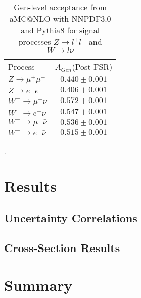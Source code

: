 \documentclass[aps,prd,final,twocolumn,letterpaper]{revtex4}
\begin{document}
			\begin{table}
				\centering
				\begin{tabular}{l  c}
					Process & $A_{Gen}$(Post-FSR) \\
					$Z\rightarrow \mu^{+}\mu^{-}$ & $0.440\pm 0.001$ \\
					$Z\rightarrow e^{+}e^{-}$ & $0.406\pm 0.001$ \\
					$W^{+}\rightarrow \mu^{+}\nu$ & $0.572\pm 0.001$ \\
					$W^{+}\rightarrow e^{+}\nu$ & $0.547\pm 0.001$ \\
					$W^{-}\rightarrow \mu^{-}\bar{\nu}$ & $0.536\pm 0.001$ \\
					$W^{-}\rightarrow e^{-}\bar{\nu}$ & $0.515\pm 0.001$ \\	
				\end{tabular}
				\caption{Gen-level acceptance from aMC@NLO with NNPDF3.0 and Pythia8 for signal processes $Z\rightarrow l^{+}l^{-}$ and $W\rightarrow l\nu$}.
				\label{tab:evolution}
			\end{table}
			
	\section{Results}
		\subsection{Uncertainty Correlations}
		\subsection{Cross-Section Results}
	\section{Summary}

	
	
\end{document}
